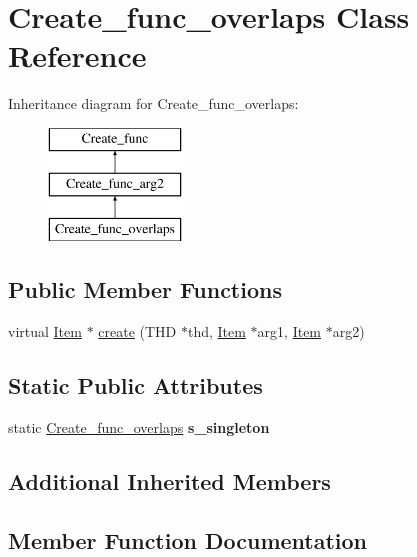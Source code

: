 \hypertarget{classCreate__func__overlaps}{}\section{Create\+\_\+func\+\_\+overlaps Class Reference}
\label{classCreate__func__overlaps}
Inheritance diagram for Create\+\_\+func\+\_\+overlaps\+:\begin{figure}[H]
\begin{center}
\leavevmode
\includegraphics[height=3.000000cm]{classCreate__func__overlaps}
\end{center}
\end{figure}
\subsection*{Public Member Functions}
\begin{DoxyCompactItemize}
\item 
virtual \mbox{\hyperlink{classItem}{Item}} $\ast$ \mbox{\hyperlink{classCreate__func__overlaps_a8c7a75ec19d8b966e3f90de4c5e12fc4}{create}} (T\+HD $\ast$thd, \mbox{\hyperlink{classItem}{Item}} $\ast$arg1, \mbox{\hyperlink{classItem}{Item}} $\ast$arg2)
\end{DoxyCompactItemize}
\subsection*{Static Public Attributes}
\begin{DoxyCompactItemize}
\item 
\mbox{\label{classCreate__func__overlaps_ae5b2f91d5615a96e60a936f64bf21d1b}} 
static \mbox{\hyperlink{classCreate__func__overlaps}{Create\+\_\+func\+\_\+overlaps}} {\bfseries s\+\_\+singleton}
\end{DoxyCompactItemize}
\subsection*{Additional Inherited Members}


\subsection{Member Function Documentation}
\mbox{\label{classCreate__func__overlaps_a8c7a75ec19d8b966e3f90de4c5e12fc4}} 

